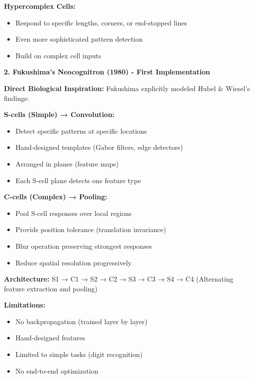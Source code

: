 \documentclass[12pt]{article}
\newcommand{\explanation}[1]{{\color{explanationcolor}#1}}
\begin{document}
\begin{enumerate}[(a)]
{{    \textbf{Hypercomplex Cells:}
    \begin{itemize}
        \item Respond to specific lengths, corners, or end-stopped lines
        \item Even more sophisticated pattern detection
        \item Build on complex cell inputs
    \end{itemize}
    }
    
    \textbf{2. Fukushima's Neocognitron (1980) - First Implementation}
    
    \explanation{
    \textbf{Direct Biological Inspiration:}
    Fukushima explicitly modeled Hubel \& Wiesel's findings:
    
    \textbf{S-cells (Simple) → Convolution:}
    \begin{itemize}
        \item Detect specific patterns at specific locations
        \item Hand-designed templates (Gabor filters, edge detectors)
        \item Arranged in planes (feature maps)
        \item Each S-cell plane detects one feature type
    \end{itemize}
    
    \textbf{C-cells (Complex) → Pooling:}
    \begin{itemize}
        \item Pool S-cell responses over local regions
        \item Provide position tolerance (translation invariance)
        \item Blur operation preserving strongest responses
        \item Reduce spatial resolution progressively
    \end{itemize}
    
    \textbf{Architecture:}
    S1 → C1 → S2 → C2 → S3 → C3 → S4 → C4
    (Alternating feature extraction and pooling)
    
    \textbf{Limitations:}
    \begin{itemize}
        \item No backpropagation (trained layer by layer)
        \item Hand-designed features
        \item Limited to simple tasks (digit recognition)
        \item No end-to-end optimization
    \end{itemize}
    }
    
}
\end{enumerate}
\end{document}
